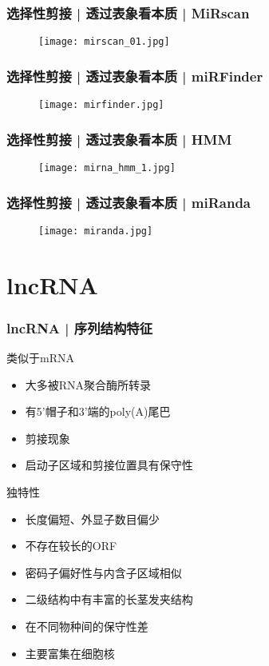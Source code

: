\begin{frame}
  \frametitle{选择性剪接 | 透过表象看本质 | MiRscan}
  \begin{figure}
    \centering
    \texttt{[image: mirscan\_01.jpg]}
  \end{figure}
\end{frame}

\begin{frame}
  \frametitle{选择性剪接 | 透过表象看本质 | miRFinder}
  \begin{figure}
    \centering
    \texttt{[image: mirfinder.jpg]}
  \end{figure}
\end{frame}

\begin{frame}
  \frametitle{选择性剪接 | 透过表象看本质 | HMM}
  \begin{figure}
    \centering
    \texttt{[image: mirna\_hmm\_1.jpg]}
  \end{figure}
\end{frame}

\begin{frame}
  \frametitle{选择性剪接 | 透过表象看本质 | miRanda}
  \begin{figure}
    \centering
    \texttt{[image: miranda.jpg]}
  \end{figure}
\end{frame}

\section{lncRNA}
\begin{frame}
  \frametitle{lncRNA | 序列结构特征}
  \begin{block}{类似于mRNA}
    \begin{itemize}
      \item 大多被RNA聚合酶所转录
      \item 有5'帽子和3'端的poly(A)尾巴
      \item 剪接现象
      \item 启动子区域和剪接位置具有保守性
    \end{itemize}
  \end{block}
  \pause
  \begin{block}{独特性}
  \begin{itemize}
    \item 长度偏短、外显子数目偏少
    \item 不存在较长的ORF
    \item 密码子偏好性与内含子区域相似
    \item 二级结构中有丰富的长茎发夹结构
    \item 在不同物种间的保守性差
    \item 主要富集在细胞核
  \end{itemize}
  \end{block}
\end{frame}

